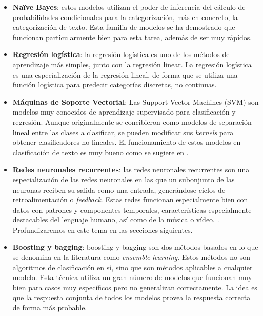 \begin{itemize}
    
    \item \textbf{Naïve Bayes}: estos modelos utilizan el poder de inferencia del cálculo de probabilidades condicionales para la categorización, más en concreto, la categorización de texto. Esta familia de modelos se ha demostrado que funcionan particularmente bien para esta tarea, además de ser muy rápidos. \cite{FrankNaive2006}
    
    \item \textbf{Regresión logística}: la regresión logística es uno de los métodos de aprendizaje más simples, junto con la regresión linear. La regresión logística es una especialización de la regresión lineal, de forma que se utiliza una función logística para predecir categorías discretas, no continuas. \cite{logitText}
    
    \item \textbf{Máquinas de Soporte Vectorial}: Las Support Vector Machines (SVM) son modelos muy conocidos de aprendizaje supervisado para clasificación y regresión. Aunque originalmente se concibieron como modelos de separación lineal entre las clases a clasificar, se pueden modificar sus \textit{kernels} para obtener clasificadores no lineales. El funcionamiento de estos modelos en clasificación de texto es muy bueno como se sugiere en \cite{SVMJoa1998}.

    \item \textbf{Redes neuronales recurrentes}: las redes neuronales recurrentes son una especialización de las redes neuronales en las que un subonjunto de las neuronas reciben su salida como una entrada, generándose ciclos de retroalimentación o \textit{feedback}. Estas redes funcionan especialmente bien con datos con patrones y componentes temporales, características especialmente destacables del lenguaje humano, así como de la música o vídeo. \cite{ZhouLSTM}. Profundizaremos en este tema en las secciones siguientes.
    
    \item \textbf{Boosting y bagging}: boosting y bagging son dos métodos basados en lo que se denomina en la literatura como \textit{ensemble learning}. Estos métodos no son algoritmos de clasificación en sí, sino que son métodos aplicables a cualquier modelo. Esta técnica utiliza un gran número de modelos que funcionan muy bien para casos muy específicos pero no generalizan correctamente. La idea es que la respuesta conjunta de todos los modelos provea la respuesta correcta de forma más probable. \cite{Bauer2004AnEC}

\end{itemize}


